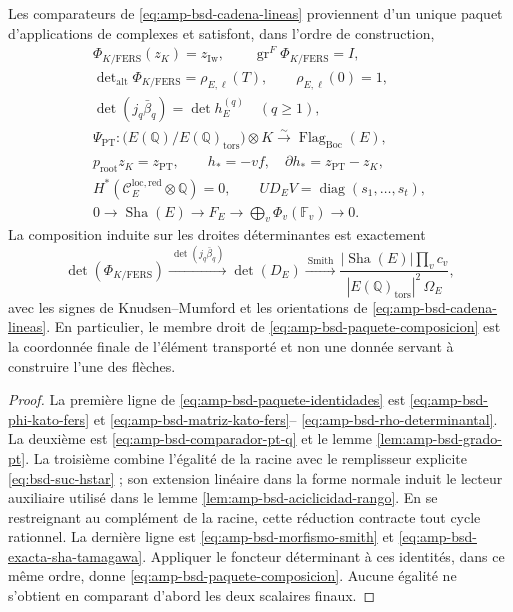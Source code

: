 \begin{proposition}
\label{prop:amp-bsd-paquete-comparadores-exacto}
Les comparateurs de
\eqref{eq:amp-bsd-cadena-lineas} proviennent d'un unique paquet d'applications de
complexes et satisfont, dans l'ordre de construction,
\begin{equation}\label{eq:amp-bsd-paquete-identidades}
 \begin{gathered}
 \Phi_{K/\mathrm{FERS}}(z_K)=z_{\mathrm{Iw}},\qquad
 \operatorname{gr}^{F}\Phi_{K/\mathrm{FERS}}=I,\\
 \det\nolimits_{\mathrm{alt}}\Phi_{K/\mathrm{FERS}}
   =\rho_{E,\ell}(T),\qquad \rho_{E,\ell}(0)=1,\\
 \det(j_q\bar\beta_q)=\det h_E^{(q)}\quad(q\geq1),\\
 \Psi_{\mathrm{PT}}:
  \bigl(E(\mathbb Q)/E(\mathbb Q)_{\mathrm{tors}}\bigr)\otimes K
  \xrightarrow{\sim}\operatorname{Flag}_{\mathrm{Boc}}(E),\\
 p_{\mathrm{root}}z_K=z_{\mathrm{PT}},\qquad
 h_*=-vf,\quad \partial h_*=z_{\mathrm{PT}}-z_K,\\
 H^*(\mathcal C_E^{\mathrm{loc,red}}\otimes\mathbb Q)=0,\qquad
 U D_E V=\operatorname{diag}(s_1,\ldots,s_t),\\
 0\longrightarrow\operatorname{Sha}(E)
  \longrightarrow F_E
  \longrightarrow\displaystyle\bigoplus_v\Phi_v(\mathbb F_v)
  \longrightarrow0 .
 \end{gathered}
\end{equation}
La composition induite sur les droites déterminantes est exactement
\begin{equation}\label{eq:amp-bsd-paquete-composicion}
 \det(\Phi_{K/\mathrm{FERS}})
 \xrightarrow{\ \det(j_q\bar\beta_q)\ }
 \det(D_E)
 \xrightarrow{\ \mathrm{Smith}\ }
 \frac{|\operatorname{Sha}(E)|\prod_vc_v}
      {|E(\mathbb Q)_{\mathrm{tors}}|^2\,\Omega_E},
\end{equation}
avec les signes de Knudsen--Mumford et les orientations de
\eqref{eq:amp-bsd-cadena-lineas}. En particulier, le membre droit de
\eqref{eq:amp-bsd-paquete-composicion} est la coordonnée finale de l'élément
transporté et non une donnée servant à construire l'une des flèches.
\end{proposition}

\begin{proof}
La première ligne de \eqref{eq:amp-bsd-paquete-identidades} est
\eqref{eq:amp-bsd-phi-kato-fers} et
\eqref{eq:amp-bsd-matriz-kato-fers}--
\eqref{eq:amp-bsd-rho-determinantal}. La deuxième est
\eqref{eq:amp-bsd-comparador-pt-q} et le lemme
\ref{lem:amp-bsd-grado-pt}. La troisième combine l'égalité de la racine avec
le remplisseur explicite \eqref{eq:bsd-suc-hstar} ; son extension linéaire dans la
forme normale induit le lecteur auxiliaire utilisé dans le lemme
\ref{lem:amp-bsd-aciclicidad-rango}. En se restreignant au complément de la
racine, cette réduction contracte tout cycle rationnel. La dernière ligne est
\eqref{eq:amp-bsd-morfismo-smith} et
\eqref{eq:amp-bsd-exacta-sha-tamagawa}. Appliquer le foncteur déterminant à
ces identités, dans ce même ordre, donne
\eqref{eq:amp-bsd-paquete-composicion}. Aucune égalité ne s'obtient
en comparant d'abord les deux scalaires finaux.
\end{proof}

